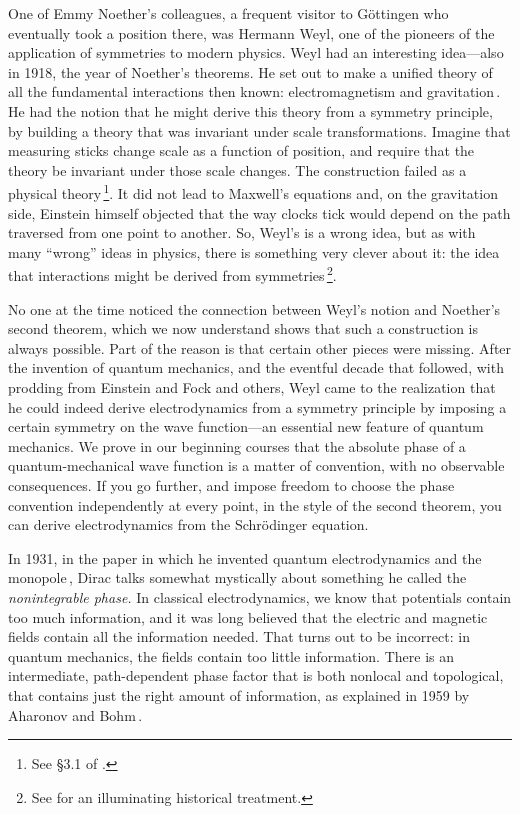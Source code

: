 \documentclass[twoside,symmetric]{tufte-handout}
\begin{document}
One of Emmy Noether's colleagues, a frequent visitor to G\"ottingen who eventually took a position there, was Hermann Weyl, one of the pioneers of the application of symmetries to modern physics. Weyl had an interesting idea---also in 1918, the year of Noether's theorems. He set out to make a unified theory of all the fundamental interactions then known: electromagnetism and gravitation$\,$\cite{Weyl:1918ib}. He had the notion that he might derive this theory from a symmetry principle, by building a theory that was invariant under scale transformations. Imagine that measuring sticks change scale as a function of position, and require that the theory be invariant under those scale changes. The construction failed as a physical theory$\,$\footnote{See \S3.1 of .}. It did not lead to Maxwell's equations and, on the gravitation side, Einstein himself objected that the way clocks tick would depend on the path traversed from one point to another. So, Weyl's is a wrong idea, but as with many ``wrong'' ideas in physics, there is something very clever about it: the idea that interactions might be derived from symmetries$\,$\footnote{See  for an illuminating historical treatment.}.

No one at the time noticed the connection between Weyl's notion and Noether's second theorem, which we now understand shows that such a construction is always possible. Part of the reason is that certain other pieces were missing. After the invention of quantum mechanics, and the eventful decade that followed, with prodding from Einstein and Fock and others, Weyl came to the realization that he could indeed derive electrodynamics from a symmetry principle by imposing a certain symmetry on the wave function---an essential new feature of quantum mechanics. We prove in our beginning courses that the absolute phase of a quantum-mechanical wave function is a matter of convention, with no observable consequences. If you go further, and impose freedom to choose the phase convention independently at every point, in the style of the second theorem, you can derive electrodynamics from the Schr\"odinger equation.

In 1931, in the paper in which he invented quantum electrodynamics and the monopole$\,$\cite{Dirac:1931kp}, Dirac talks somewhat mystically about something he called the \emph{nonintegrable phase.} In classical electrodynamics, we know that potentials contain too much information, and it was long believed that the electric and magnetic fields contain all the information needed. That turns out to be incorrect: in quantum mechanics, the fields contain too little information. There is an intermediate, path-dependent phase factor that is both nonlocal and topological, that contains just the right amount of information, as explained in 1959 by Aharonov and Bohm$\,$\cite[-41pt]{Aharonov:1959fk}.
\end{document}
